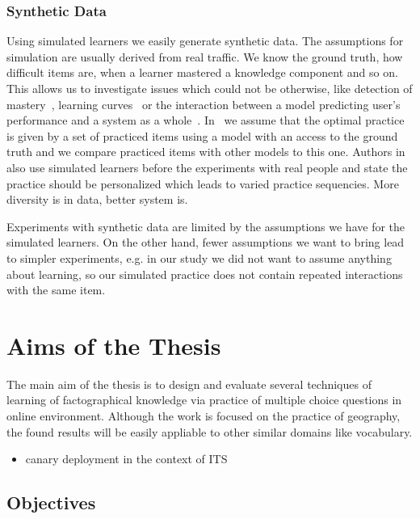 \documentclass[table,color]{fithesis3/fithesis3}
\begin{document}
\subsection{Synthetic Data}

Using simulated learners we easily generate synthetic data. The assumptions for
simulation are usually derived from real traffic. We know the ground truth, how
difficult items are, when a learner mastered a knowledge component and so on.
This allows us to investigate issues which could not be otherwise, like
detection of mastery~\cite{fancsali2013optimal}, learning
curves~\cite{fancsali2013simulated} or the interaction between a model
predicting user's performance and a system as a
whole~\cite{niznan2015exploring}. In~\cite{niznan2015exploring} we assume that
the optimal practice is given by a set of practiced items using a model with an
access to the ground truth and we compare practiced items with other models to
this one. Authors in~\cite{lopes2015multi} also use simulated learners before
the experiments with real people and state the practice should be personalized
which leads to varied practice sequencies. More diversity is in data, better
system is.

Experiments with synthetic data are limited by the assumptions we have for the
simulated learners. On the other hand, fewer assumptions we want to bring lead
to simpler experiments, e.g. in our study we did not want to assume anything
about learning, so our simulated practice does not contain repeated
interactions with the same item.

\chapter{Aims of the Thesis}

The main aim of the thesis is to design and evaluate several techniques of
learning of factographical knowledge via practice of multiple choice questions in
online environment. Although the work is focused on the practice of geography,
the found results will be easily appliable to other similar domains like
vocabulary.

\begin{itemize}
	\item canary deployment in the context of ITS
\end{itemize}

\section{Objectives}
\end{document}
